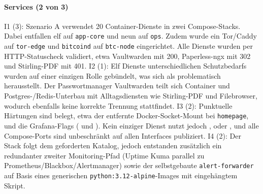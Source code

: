 \paragraph{Services (2 von 3)}
I1 (3): Szenario A verwendet 20 Container-Dienste in zwei Compose-Stacks. Dabei entfallen elf auf \texttt{app-core} und neun auf \texttt{ops}. Zudem wurde ein Tor/Caddy auf \texttt{tor-edge} und
\texttt{bitcoind} auf \texttt{btc-node} eingerichtet. Alle Dienste wurden per
\ac{HTTP}-Statuscheck validiert, etwa Vaultwarden mit 200, Paperless-ngx mit 302 und
Stirling-\ac{PDF} mit 401.\cite{runbookA,composeA}
I2 (1): Elf Dienste unterschiedlichen Schutzbedarfs wurden auf einer einzigen
Rolle gebündelt, was sich als problematisch herausstellt. Der Passwortmanager Vaultwarden teilt sich Container und Postgres-/Redis-Unterbau mit Alltagsdiensten wie Stirling-\ac{PDF} und
Filebrowser, wodurch ebenfalls keine korrekte Trennung stattfindet.\cite{composeA,runbookA}
I3 (2): Punktuelle Härtungen sind belegt, etwa der entfernte Docker-Socket-Mount bei \texttt{homepage},  und die Grafana-Flags ( und ).
Kein einziger Dienst nutzt jedoch ,  oder , und alle Compose-Ports sind unbeschränkt auf allen Interfaces publiziert.\cite{composeA,runbookA}
I4 (2): Der Stack folgt dem geforderten Katalog, jedoch entstanden zusätzlich ein redundanter zweiter Monitoring-Pfad (Uptime Kuma parallel zu Prometheus/Blackbox/Alertmanager) sowie der selbstgebaute \texttt{alert-forwarder} auf Basis eines generischen \texttt{python:3.12-alpine}-Images mit eingehängtem Skript.\cite{composeA}

